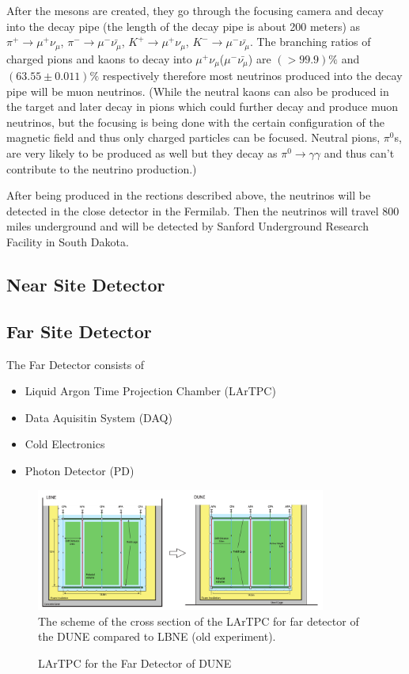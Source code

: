 After the mesons are created, they go through the focusing camera and decay into the decay pipe (the length of the decay pipe is about 200 meters) as $\pi^+ \rightarrow \mu^+\nu_\mu$, $\pi^- \rightarrow \mu^-\bar{\nu_\mu}$, $K^+ \rightarrow \mu^+\nu_\mu$, $K^- \rightarrow \mu^-\bar{\nu_\mu}$. The branching ratios of charged pions and kaons to decay into $\mu^+\nu_\mu$($\mu^-\bar{\nu_\mu}$) are $(>99.9)\%$ and $(63.55\pm0.011)\%$ respectively therefore most neutrinos produced into the decay pipe will be muon neutrinos. (While the neutral kaons can also be produced in the target and later decay in pions which could further decay and produce muon neutrinos, but the focusing is being done with the certain configuration of the magnetic field and thus only charged particles can be focused. Neutral pions, $\pi^0$s, are very likely to be produced as well but they decay as $\pi^0 \rightarrow \gamma\gamma$ and thus can't contribute to the neutrino production.)

After being produced in the rections described above, the neutrinos will be detected in the close detector in the Fermilab. Then the neutrinos will travel 800 miles underground and will be detected by Sanford Underground Research Facility in South Dakota.  

\subsection{Near Site Detector}

\subsection{Far Site Detector}
The Far Detector consists of 
\begin{itemize}
  \item Liquid Argon Time Projection Chamber (LArTPC)
  \item Data Aquisitin System (DAQ)
  \item Cold Electronics
  \item Photon Detector (PD)
\end{itemize}

\begin{figure}
\caption{LArTPC for the Far Detector of DUNE}
\label{fig:LBNF_TPC}
\centering
\includegraphics[width=0.85\textwidth, keepaspectratio=true]{figs/LBNF_TPC.png}
\\The scheme of the cross section of the LArTPC for far detector of the DUNE compared to LBNE (old experiment).   
\end{figure}

